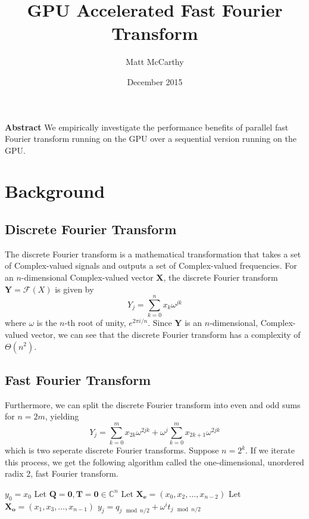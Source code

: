 \documentclass[notitlepage, twocolumn]{article}
\title{\bf
GPU Accelerated Fast Fourier Transform
}
\date{December 2015}
\author{
Matt McCarthy
}
\affil{Christopher Newport University\\
\texttt{\href{mailto:matthew.mccarthy.12@cnu.edu}{matthew.mccarthy.12@cnu.edu}}
}
\def\CC{\mathbb{C}}	%
\newcommand{\set}[1]{\lbrace #1 \rbrace}
\begin{document}
\maketitle

\noindent\textbf{Abstract}
We empirically investigate the performance benefits of parallel fast Fourier transform running on the GPU over a sequential version running on the GPU.

\section{Background}

\subsection{Discrete Fourier Transform}

The discrete Fourier transform is a mathematical transformation that takes a set of Complex-valued signals and outputs a set of Complex-valued frequencies.
For an $n$-dimensional Complex-valued vector $\mathbf{X}$, the discrete Fourier transform $\mathbf{Y}=\mathcal{F}(X)$ is given by
\[
	Y_j = \sum_{k=0}^n x_k \omega^{jk}
\]
where $\omega$ is the $n$-th root of unity, $e^{2\pi i/n}$.
Since $\mathbf{Y}$ is an $n$-dimensional, Complex-valued vector, we can see that the discrete Fourier transform has a complexity of $\Theta(n^2)$.

\subsection{Fast Fourier Transform}

Furthermore, we can split the discrete Fourier transform into even and odd sums for $n=2m$, yielding
\[
	Y_j = \sum_{k=0}^m x_{2k}\omega^{2jk} + \omega^j\sum_{k=0}^m x_{2k+1}\omega^{2jk}
\]
which is two seperate discrete Fourier transforms.
Suppose $n=2^k$.
If we iterate this process, we get the following algorithm called the one-dimensional, unordered radix 2, fast Fourier transform.

\begin{algorithmic}[1]
			\State $y_0=x_0$
		\Else
			\State Let $\mathbf{Q}=\mathbf{0},\mathbf{T}=\mathbf{0}\in\CC^n$
			\State Let $\mathbf{X_e}=(x_0, x_2,\ldots,x_{n-2})$
			\State Let $\mathbf{X_o}=(x_1, x_3,\ldots,x_{n-1})$
			\State {}
			\State {}
			\ForAll{$j\in\set{0,1,\ldots,n-1}$}
				\State $y_j=q_{j\mod{n/2}}+\omega^i t_{j\mod{n/2}}$
			\EndFor
		\EndIf
	\EndFunction
\end{algorithmic}
\end{document}
